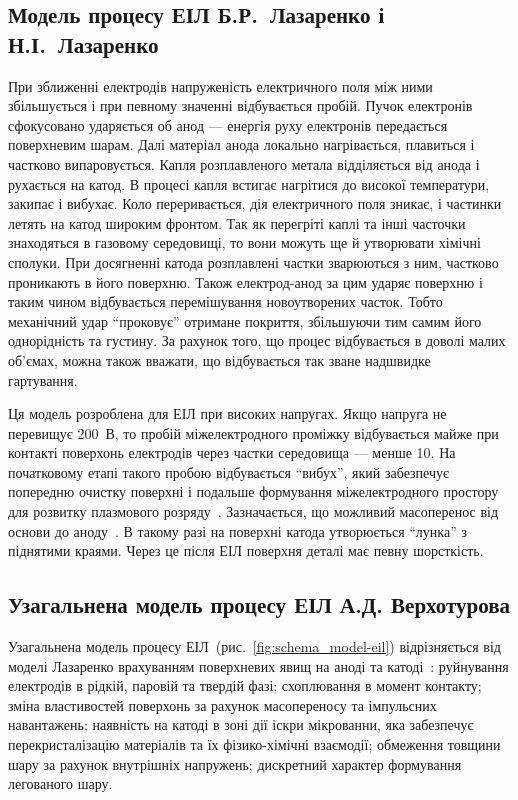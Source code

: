 \documentclass[a4paper,fontsize=14bp,ukrainian]{extreport}
\begin{document}
\subsection{Модель процесу ЕІЛ Б.Р.~Лазаренко і Н.І.~Лазаренко}
\label{subsec:model_lazarenko}

При зближенні електродів напруженість електричного поля між ними збільшується і при певному значенні відбувається пробій. Пучок електронів сфокусовано ударяється об анод --- енергія руху електронів передається поверхневим шарам. Далі матеріал анода локально нагрівається, плавиться і частково випаровується. Капля розплавленого метала відділяється від анода і рухається на катод. В процесі капля встигає нагрітися до високої температури, закипає і вибухає. Коло переривається, дія електричного поля зникає, і частинки летять на катод широким фронтом. Так як перегріті каплі та інші часточки знаходяться в газовому середовищі, то вони можуть ще  й утворювати хімічні сполуки. При досягненні катода розплавлені частки зварюються з ним, частково проникають в його поверхню. Також електрод-анод за цим ударяє поверхню і таким чином відбувається перемішування новоутворених часток. Тобто механічний удар ``проковує'' отримане покриття, збільшуючи тим самим його однорідність та густину. За рахунок того, що процес відбувається в доволі малих об'ємах, можна також вважати, що відбувається так зване надшвидке гартування.~\cite{hitlevich1985}

Ця модель розроблена для ЕІЛ при високих напругах. Якщо напруга не перевищує 200~В, то пробій міжелектродного проміжку відбувається майже при контакті поверхонь електродів через частки середовища --- менше \SI{10}{\mkm}. На початковому етапі такого пробою відбувається ``вибух'', який забезпечує попередню очистку поверхні і подальше формування міжелектродного простору для розвитку плазмового розряду~\cite{miczkevich1977}. Зазначається, що можливий масоперенос від основи до аноду~\cite{lazarenko1965}. В такому разі на поверхні катода утворюється ``лунка'' з піднятими краями. Через це після ЕІЛ поверхня деталі має певну шорсткість.

\subsection{Узагальнена модель процесу ЕІЛ А.Д. Верхотурова}
\label{subsec:model_verkhoturov}

Узагальнена модель процесу ЕІЛ~(рис.~\ref{fig:schema_model-eil}) відрізняється від моделі Лазаренко врахуванням поверхневих явищ на аноді та катоді~\cite{verkhoturov1983}: руйнування електродів в рідкій, паровій та твердій фазі; схоплювання в момент контакту; зміна властивостей поверхонь за рахунок масопереносу та імпульсних навантажень; наявність на катоді в зоні дії іскри мікрованни, яка забезпечує перекристалізацію матеріалів та їх фізико-хімічні взаємодії; обмеження товщини шару за рахунок внутрішніх напружень; дискретний характер формування легованого шару.
\end{document}
